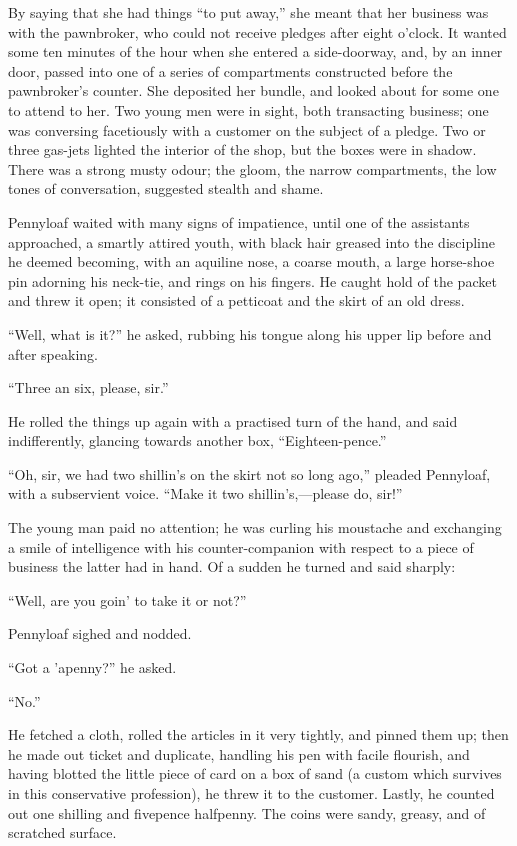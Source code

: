 By saying that she had things ``to put away,'' she meant that her
business was with the pawnbroker, who could not receive pledges after
eight o'clock. It wanted some ten minutes of the hour when she entered a
side-doorway, and, by an inner door, passed into one of a series of
compartments constructed before the pawnbroker's counter. She deposited
her bundle, and looked about for some one to attend to her. Two young
men were in sight, both transacting business; {}one was conversing
facetiously with a customer on the subject of a pledge. Two or three
gas-jets lighted the interior of the shop, but the boxes were in shadow.
There was a strong musty odour; the gloom, the narrow compartments, the
low tones of conversation, suggested stealth and shame.

Pennyloaf waited with many signs of impatience, until one of the
assistants approached, a smartly attired youth, with black hair greased
into the discipline he deemed becoming, with an aquiline nose, a coarse
mouth, a large horse-shoe pin adorning his neck-tie, and rings on his
fingers. He caught hold of the packet and threw it open; it consisted of
a petticoat and the skirt of an old dress.

``Well, what is it?'' he asked, rubbing his tongue along his upper lip
before and after speaking.

``Three an six, please, sir.''

He rolled the things up again with a practised turn of the hand, and
said indifferently, glancing towards another box, ``Eighteen-pence.''

{}``Oh, sir, we had two shillin's on the skirt not so long ago,''
pleaded Pennyloaf, with a subservient voice. ``Make it two
shillin's,---please do, sir!''

The young man paid no attention; he was curling his moustache and
exchanging a smile of intelligence with his counter-companion with
respect to a piece of business the latter had in hand. Of a sudden he
turned and said sharply:

``Well, are you goin' to take it or not?''

Pennyloaf sighed and nodded.

``Got a 'apenny?'' he asked.

``No.''

He fetched a cloth, rolled the articles in it very tightly, and pinned
them up; then he made out ticket and duplicate, handling his pen with
facile flourish, and having blotted the little piece of card on a box of
sand (a custom which survives in this conservative profession), he threw
it to the customer. Lastly, he counted out one shilling and fivepence
halfpenny. The coins were sandy, greasy, and of scratched surface.

